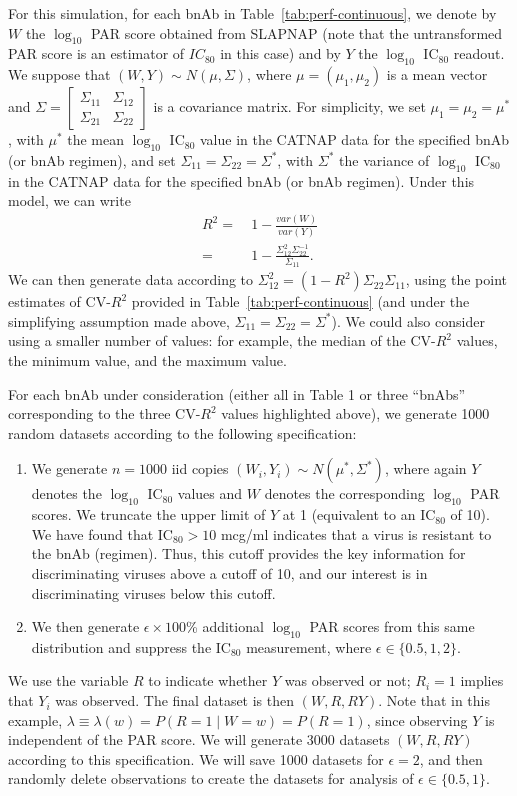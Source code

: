 \documentclass[10pt]{article}
\begin{document}
For this simulation, for each bnAb in Table~\ref{tab:perf-continuous}, we denote by $W$ the $\log_{10}$ PAR score obtained from SLAPNAP (note that the untransformed PAR score is an estimator of $IC_{80}$ in this case) and by $Y$ the $\log_{10}$ IC$_{80}$ readout. We suppose that $(W,Y) \sim N(\mu, \Sigma)$, where $\mu = (\mu_1, \mu_2)$ is a mean vector and $\Sigma = \begin{bmatrix} \Sigma_{11} & \Sigma_{12} \\ \Sigma_{21} & \Sigma_{22} \end{bmatrix}$ is a covariance matrix. For simplicity, we set $\mu_1 = \mu_2 = \mu^*$, with $\mu^*$ the mean $\log_{10}$ IC$_{80}$ value in the CATNAP data for the specified bnAb (or bnAb regimen), and set $\Sigma_{11} = \Sigma_{22} = \Sigma^*$, with $\Sigma^*$ the variance of $\log_{10}$ IC$_{80}$ in the CATNAP data for the specified bnAb (or bnAb regimen). Under this model, we can write
\begin{align*}
    R^2 =& \ 1 - \frac{var(W)}{var(Y)} \\
    =& \ 1 - \frac{\Sigma_{12}^2\Sigma_{22}^{-1}}{\Sigma_{11}}.
\end{align*}
We can then generate data according to $\Sigma_{12}^2 = (1 - R^2)\Sigma_{22}\Sigma_{11}$, using the point estimates of CV-$R^2$ provided in Table~\ref{tab:perf-continuous} (and under the simplifying assumption made above, $\Sigma_{11} = \Sigma_{22} = \Sigma^*$). We could also consider using a smaller number of values: for example, the median of the CV-$R^2$ values, the minimum value, and the maximum value.

For each bnAb under consideration (either all in Table 1 or three ``bnAbs'' corresponding to the three CV-$R^2$ values highlighted above), we generate 1000 random datasets according to the following specification:
\begin{enumerate}
    \item We generate $n = 1000$ iid copies $(W_i, Y_i) \sim N(\mu^*, \Sigma^*)$, where again $Y$ denotes the $\log_{10}$ IC$_{80}$ values and $W$ denotes the corresponding $\log_{10}$ PAR scores. We truncate the upper limit of $Y$ at 1 (equivalent to an IC$_{80}$ of 10). We have found that IC$_{80} > 10$ mcg/ml indicates that a virus is resistant to the bnAb (regimen). Thus, this cutoff provides the key information for discriminating viruses above a cutoff of 10, and our interest is in discriminating viruses below this cutoff.
    \item We then generate $\epsilon \times 100$\% additional $\log_{10}$ PAR scores from this same distribution and suppress the IC$_{80}$ measurement, where $\epsilon \in \{0.5, 1, 2\}$.
\end{enumerate}
We use the variable $R$ to indicate whether $Y$ was observed or not; $R_i = 1$ implies that $Y_i$ was observed. The final dataset is then $(W, R, RY)$. Note that in this example, $\lambda \equiv \lambda(w) = P(R = 1 \mid W = w) = P(R = 1)$, since observing $Y$ is independent of the PAR score. We will generate 3000 datasets $(W, R, RY)$ according to this specification. We will save 1000 datasets for $\epsilon = 2$, and then randomly delete observations to create the datasets for analysis of $\epsilon \in \{0.5, 1\}$.
\end{document}
